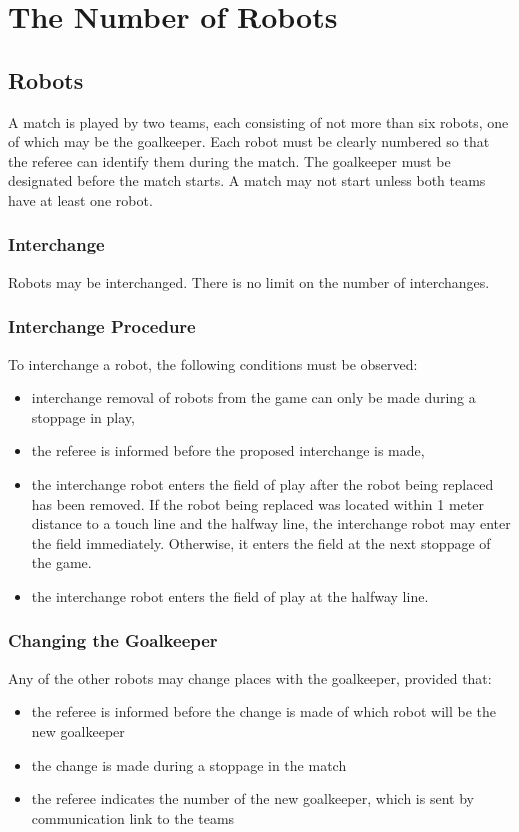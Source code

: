 \section{The Number of Robots}\label{sec:number-of-robots}

\subsection{Robots}
A match is played by two teams, each consisting of not more than six robots, one of which may be the goalkeeper.
Each robot must be clearly numbered so that the referee can identify them during the match.
The goalkeeper must be designated before the match starts.
A match may not start unless both teams have at least one robot.

\subsubsection{Interchange}\label{subsubsec:number-of-robots-interchange}
Robots may be interchanged.
There is no limit on the number of interchanges.

\subsubsection{Interchange Procedure}
To interchange a robot, the following conditions must be observed:
\begin{itemize}
\item interchange removal of robots from the game can only be made during a stoppage in play,
\item the referee is informed before the proposed interchange is made,
\item the interchange robot enters the field of play after the robot being replaced has been removed.
If the robot being replaced was located within 1 meter distance to a touch line and the halfway line, the interchange robot may enter the field immediately. Otherwise, it enters the field at the next stoppage of the game.
\item the interchange robot enters the field of play at the halfway line.
\end{itemize}

\subsubsection{Changing the Goalkeeper}
Any of the other robots may change places with the goalkeeper, provided that:
\begin{itemize}
\item the referee is informed before the change is made of which robot will be the new goalkeeper
\item the change is made during a stoppage in the match
\item the referee indicates the number of the new goalkeeper, which is sent by communication link to the teams
\end{itemize}

